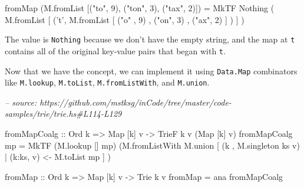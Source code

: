 \documentclass[]{article}
\newenvironment{Shaded}{}{}
\newcommand{\CharTok}[1]{\textcolor[rgb]{0.25,0.44,0.63}{#1}}
\newcommand{\CommentTok}[1]{\textcolor[rgb]{0.38,0.63,0.69}{\textit{#1}}}
\newcommand{\DataTypeTok}[1]{\textcolor[rgb]{0.56,0.13,0.00}{#1}}
\newcommand{\DecValTok}[1]{\textcolor[rgb]{0.25,0.63,0.44}{#1}}
\newcommand{\FunctionTok}[1]{\textcolor[rgb]{0.02,0.16,0.49}{#1}}
\newcommand{\NormalTok}[1]{#1}
\newcommand{\OtherTok}[1]{\textcolor[rgb]{0.00,0.44,0.13}{#1}}
\newcommand{\StringTok}[1]{\textcolor[rgb]{0.25,0.44,0.63}{#1}}
\begin{document}
\begin{Shaded}
\begin{Highlighting}[]
\NormalTok{fromMap (M.fromList [(}\StringTok{"to"}\NormalTok{, }\DecValTok{9}\NormalTok{), (}\StringTok{"ton"}\NormalTok{, }\DecValTok{3}\NormalTok{), (}\StringTok{"tax"}\NormalTok{, }\DecValTok{2}\NormalTok{)])}
    \FunctionTok{=} \DataTypeTok{MkTF} \DataTypeTok{Nothing}\NormalTok{ (}
\NormalTok{          M.fromList [}
\NormalTok{            (}\CharTok{'t'}\NormalTok{, M.fromList [}
\NormalTok{                (}\StringTok{"o"}\NormalTok{ , }\DecValTok{9}\NormalTok{)}
\NormalTok{              , (}\StringTok{"on"}\NormalTok{, }\DecValTok{3}\NormalTok{)}
\NormalTok{              , (}\StringTok{"ax"}\NormalTok{, }\DecValTok{2}\NormalTok{)}
\NormalTok{              ]}
\NormalTok{            )}
\NormalTok{          ]}
\NormalTok{        )}
\end{Highlighting}
\end{Shaded}

The value is \texttt{Nothing} because we don't have the empty string, and the
map at \texttt{t} contains all of the original key-value pairs that began with
\texttt{t}.

Now that we have the concept, we can implement it using \texttt{Data.Map}
combinators like \texttt{M.lookup}, \texttt{M.toList}, \texttt{M.fromListWith},
and \texttt{M.union}.

\begin{Shaded}
\begin{Highlighting}[]
\CommentTok{-- source: https://github.com/mstksg/inCode/tree/master/code-samples/trie/trie.hs#L114-L129}

\NormalTok{fromMapCoalg}
\OtherTok{    ::} \DataTypeTok{Ord}\NormalTok{ k}
    \OtherTok{=>} \DataTypeTok{Map}\NormalTok{ [k] v}
    \OtherTok{->} \DataTypeTok{TrieF}\NormalTok{ k v (}\DataTypeTok{Map}\NormalTok{ [k] v)}
\NormalTok{fromMapCoalg mp }\FunctionTok{=} \DataTypeTok{MkTF}\NormalTok{ (M.lookup [] mp)}
\NormalTok{                       (M.fromListWith M.union}
\NormalTok{                          [ (k   , M.singleton ks v)}
                          \FunctionTok{|}\NormalTok{ (k}\FunctionTok{:}\NormalTok{ks, v) }\OtherTok{<-}\NormalTok{ M.toList mp}
\NormalTok{                          ]}
\NormalTok{                       )}

\NormalTok{fromMap}
\OtherTok{    ::} \DataTypeTok{Ord}\NormalTok{ k}
    \OtherTok{=>} \DataTypeTok{Map}\NormalTok{ [k] v}
    \OtherTok{->} \DataTypeTok{Trie}\NormalTok{ k v}
\NormalTok{fromMap }\FunctionTok{=}\NormalTok{ ana fromMapCoalg}
\end{Highlighting}
\end{Shaded}
\end{document}
